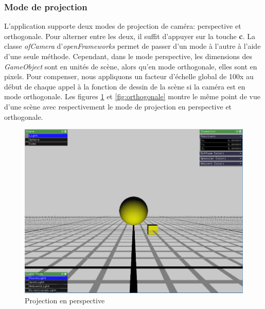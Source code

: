 \subsubsection{Mode de projection}
\label{s:projection}
L'application supporte deux modes de projection de caméra: perspective et orthogonale.
Pour alterner entre les deux, il suffit d'appuyer sur la touche \textbf{c}.
La classe \emph{ofCamera} d'\emph{openFrameworks} permet de passer d'un mode à l'autre à l'aide d'une seule méthode.
Cependant, dans le mode perspective, les dimensions des \emph{GameObject} sont en unités de scène, alors qu'en mode orthogonale, elles sont en pixels.
Pour compenser, nous appliquons un facteur d'échelle global de 100x au début de chaque appel à la fonction de dessin de la scène si la caméra est en mode orthogonale.
Les figures \ref{fig:perspective} et \ref{fig:orthogonale} montre le même point de vue d'une scène avec respectivement le mode de projection en perspective et orthogonale.

\begin{figure}[H]
    \centering
	\includegraphics[scale=0.25]{fig/scenePOV1.png}
	\caption{Projection en perspective}
	\label{fig:perspective}
\end{figure}


